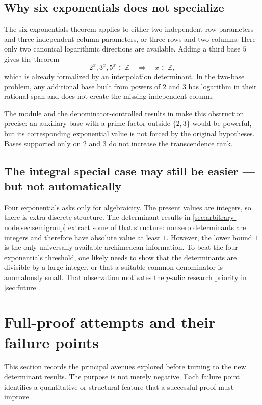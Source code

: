 \documentclass[11pt,oneside]{article}
\theoremstyle{definition}
\theoremstyle{remark}
\newcommand{\Z}{\mathbb Z}
\begin{document}
\subsection{Why six exponentials does not specialize}

The six exponentials theorem applies to either two independent row parameters and three
independent column parameters, or three rows and two columns.  Here only two canonical
logarithmic directions are available.  Adding a third base $5$ gives the theorem
\[
  2^x,3^x,5^x\in\Z\quad\Longrightarrow\quad x\in\Z,
\]
which is already formalized by an interpolation determinant.  In the two-base problem, any
additional base built from powers of $2$ and $3$ has logarithm in their rational span and does
not create the missing independent column.

The module  and the denominator-controlled results in
 make this obstruction precise: an auxiliary base with a prime
factor outside $\{2,3\}$ would be powerful, but its corresponding exponential value is not
forced by the original hypotheses.  Bases supported only on $2$ and $3$ do not increase the
transcendence rank.

\subsection{The integral special case may still be easier --- but not automatically}

Four exponentials asks only for algebraicity.  The present values are integers, so there is
extra discrete structure.  The determinant results in \cref{sec:arbitrary-node,sec:semigroup}
extract some of that structure: nonzero determinants are integers and therefore have absolute
value at least $1$.  However, the lower bound $1$ is the only universally available
archimedean information.  To beat the four-exponentials threshold, one likely needs to show
that the determinants are divisible by a large integer, or that a suitable common denominator
is anomalously small.  That observation motivates the $p$-adic research priority in
\cref{sec:future}.

\section{Full-proof attempts and their failure points}
\label{sec:attempts}

This section records the principal avenues explored before turning to the new determinant
results.  The purpose is not merely negative.  Each failure point identifies a quantitative or
structural feature that a successful proof must improve.
\end{document}
